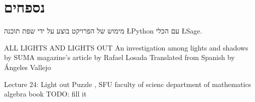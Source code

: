 \documentclass[12pt,twoside]{article}
\begin{document}
\newpage

\section{נספחים}
מימוש של הפרויקט בוצע על ידי 
שפת תוכנה 
\L{Python}
עם הכלי 
\L{Sage}.

\unsethebrew

\sethebrew
\newpage
\begin{thebibliography}{99}
\unsethebrew
{} ALL LIGHTS AND LIGHTS OUT
An investigation among lights and shadows by
SUMA magazine’s article by Rafael Losada
Translated from Spanish by Ángeles Vallejo

 Lecture 24: Light out Puzzle , SFU faculty of scienc department of mathematics
 algebra book TODO: fill it
\end{thebibliography}
\end{document}
